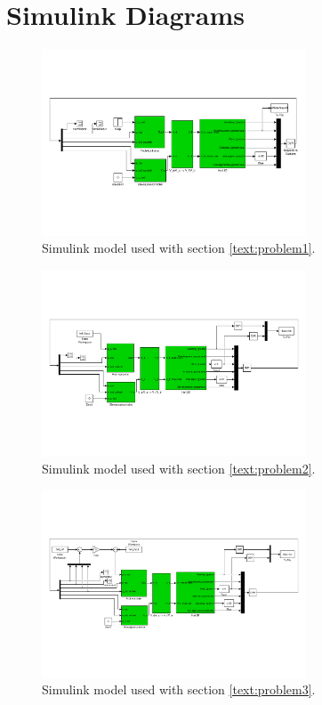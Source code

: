 \section{Simulink Diagrams}\label{sec:simulink}
\begin{figure}[h]
	\centering
		\includegraphics[width = 0.70\textwidth]{figures/1/simulink.pdf}
	\caption{Simulink model used with section \ref{text:problem1}.}
\end{figure}
\begin{figure}[h]
	\centering
		\includegraphics[width = 0.70\textwidth]{figures/2/simulink.pdf}
	\caption{Simulink model used with section \ref{text:problem2}.}
\end{figure}

\begin{figure}[h]
	\centering
		\includegraphics[width = 0.70\textwidth]{figures/3/simulink.pdf}
	\caption{Simulink model used with section \ref{text:problem3}.}
\end{figure}

